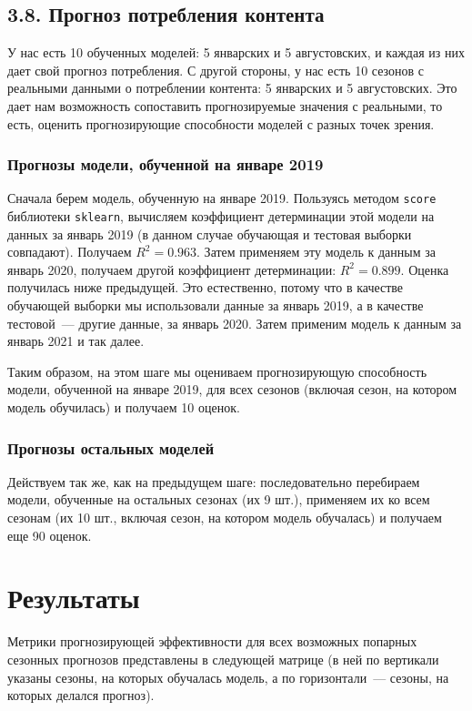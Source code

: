 \documentclass[a4paper,12pt]{article}
\begin{document}
\subsection{3.8. Прогноз потребления контента}

У нас есть 10 обученных моделей: 5 январских и 5 августовских, и каждая из них дает свой прогноз потребления. С другой стороны, у нас есть 10 сезонов с реальными данными о потреблении контента: 5 январских и 5 августовских. Это дает нам возможность сопоставить прогнозируемые значения с реальными, то есть, оценить прогнозирующие способности моделей с разных точек зрения.

\subsubsection{Прогнозы модели, обученной на январе 2019} 
Сначала берем модель, обученную на январе 2019. Пользуясь методом \texttt{score} библиотеки \texttt{sklearn}, вычисляем коэффициент детерминации этой модели на данных за январь 2019 (в данном случае обучающая и тестовая выборки совпадают). Получаем $R^2 = 0.963$. Затем применяем эту модель к данным за январь 2020, получаем другой коэффициент детерминации: $R^2 = 0.899$. Оценка получилась ниже предыдущей. Это естественно, потому что в качестве обучающей выборки мы использовали данные за январь 2019, а в качестве тестовой~--- другие данные, за январь 2020. Затем применим модель к данным за январь 2021 и так далее. 

Таким образом, на этом шаге мы оцениваем прогнозирующую способность модели, обученной на январе 2019, для всех сезонов (включая сезон, на котором модель обучилась) и получаем 10 оценок.

\subsubsection{Прогнозы остальных моделей}

Действуем так же, как на предыдущем шаге: последовательно перебираем модели, обученные на остальных сезонах (их 9 шт.), применяем их ко всем сезонам (их 10 шт., включая сезон, на котором модель обучалась) и получаем еще 90 оценок.

\section{Результаты}

Метрики прогнозирующей эффективности для всех возможных попарных сезонных  прогнозов представлены в следующей матрице (в  ней по вертикали указаны сезоны, на которых обучалась модель, а по горизонтали — сезоны, на которых делался прогноз). 
\end{document}

